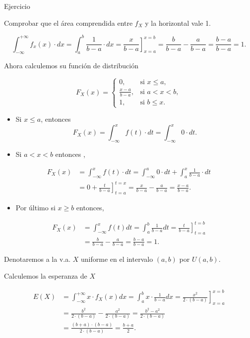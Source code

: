 \documentclass[
  letterpaper,
  DIV=11,
  numbers=noendperiod]{scrreprt}
\providecommand{\tightlist}{%
  \setlength{\itemsep}{0pt}\setlength{\parskip}{0pt}}\usepackage{longtable,booktabs,array}
\begin{document}
\begin{Ejercicio}{Ejercicio}{}

Comprobar que el área comprendida entre \(f_X\) y la horizontal vale 1.

\[
\int_{-\infty}^{+\infty} f_x(x)\cdot dx=\int_{a}^{b} \frac{1}{b-a} \cdot dx=\left.\frac{x}{b-a}\right]_{x=a}^{x=b}=\frac{b}{b-a}-\frac{a}{b-a}=
\frac{b-a}{b-a}=1.
\]

\end{Ejercicio}

Ahora calculemos su función de distribución

\[
F_X(x)=\left\{\begin{array}{ll} 0, & \mbox{si } x\leq a,\\
\frac{x-a}{b-a}, & \mbox{si } a<x<b,\\ 1, & \mbox{si } b\leq x.
\end{array}
\right. 
\]

\begin{itemize}
\tightlist
\item
  Si \(x\leq a\), entonces
  \[F_X(x)=\int_{-\infty}^{x} f(t)\cdot dt= \int_{-\infty}^{x} 0\cdot dt.\]
\item
  Si \(a<x<b\) entonces ,
\end{itemize}

\[
\begin{array}{rl}
F_X(x)&=\displaystyle\int_{-\infty}^{x} f(t)\cdot dt= \int_{-\infty}^{a} 0\cdot dt+\int_{a}^{x} \frac1{b-a} \cdot dt\\
&= \displaystyle 0 +\left.\frac{t}{b-a}\right]_{t=a}^{t=x}= \frac{x}{b-a}-\frac{a}{b-a}=\frac{x-a}{b-a}.
\end{array}
\]

\begin{itemize}
\tightlist
\item
  Por último si \(x\geq b\) entonces,
\end{itemize}

\[
\begin{array}{rl}
F_X(x)&=\displaystyle\int_{-\infty}^{x} f(t) dt=\int_{a}^{b} \frac{1}{b-a} dt=
 \left. \frac{t}{b-a} \right]_{t=a}^{t=b}
\\&=\displaystyle \frac{b}{b-a}-\frac{a}{b-a}=\frac{b-a}{b-a}=1.
\end{array}
\]

Denotaremos a la v.a. \(X\) uniforme en el intervalo \((a,b)\) por
\(U(a,b)\).

Calculemos la esperanza de \(X\)

\[
\begin{array}{rl}
E(X)&=\displaystyle\int_{-\infty}^{+\infty} x\cdot f_X(x) dx =\int_{a}^{b} x \cdot \frac{1}{b-a} dx =
\left.\frac{x^2}{2\cdot (b-a)}\right]_{x=a}^{x=b}\\
&=\displaystyle \frac{b^2}{2\cdot (b-a)}-\frac{a^2}{2\cdot (b-a)} =
\frac{b^2-a^2}{2\cdot (b-a)} \\ & =\displaystyle\frac{(b+a)\cdot (b-a)}{2\cdot (b-a)}=
\frac{b+a}{2}.
\end{array}
\]
\end{document}
